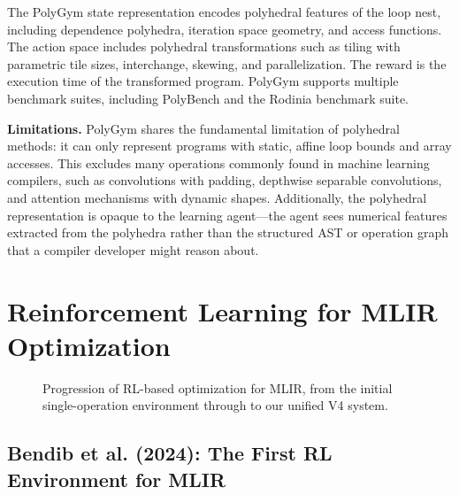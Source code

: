 The PolyGym state representation encodes polyhedral features of the loop nest, including dependence polyhedra, iteration space geometry, and access functions. The action space includes polyhedral transformations such as tiling with parametric tile sizes, interchange, skewing, and parallelization. The reward is the execution time of the transformed program. PolyGym supports multiple benchmark suites, including PolyBench and the Rodinia benchmark suite.

\textbf{Limitations.} PolyGym shares the fundamental limitation of polyhedral methods: it can only represent programs with static, affine loop bounds and array accesses. This excludes many operations commonly found in machine learning compilers, such as convolutions with padding, depthwise separable convolutions, and attention mechanisms with dynamic shapes. Additionally, the polyhedral representation is opaque to the learning agent—the agent sees numerical features extracted from the polyhedra rather than the structured AST or operation graph that a compiler developer might reason about.

\section{Reinforcement Learning for MLIR Optimization}

\begin{figure}[H]
    \centering
    \caption{Progression of RL-based optimization for MLIR, from the initial single-operation environment through to our unified V4 system.}
    \label{fig:mlir-rl-evolution}
\end{figure}

\subsection{Bendib et al. (2024): The First RL Environment for MLIR}

